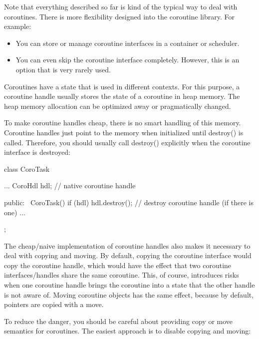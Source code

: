 Note that everything described so far is kind of the typical way to deal with coroutines. There is more flexibility designed into the coroutine library. For example:

\begin{itemize}
\item 
You can store or manage coroutine interfaces in a container or scheduler.

\item 
You can even skip the coroutine interface completely. However, this is an option that is very rarely used.
\end{itemize}


Coroutines have a state that is used in different contexts. For this purpose, a coroutine handle usually stores the state of a coroutine in heap memory. The heap memory allocation can be optimized away or pragmatically changed.


To make coroutine handles cheap, there is no smart handling of this memory. Coroutine handles just point to the memory when initialized until destroy() is called. Therefore, you should usually call destroy() explicitly when the coroutine interface is destroyed:

\begin{cpp}
class CoroTask {
	...
	CoroHdl hdl; // native coroutine handle
	
	public:
	~CoroTask() {
		if (hdl) {
			hdl.destroy(); // destroy coroutine handle (if there is one)
		}
	}
	...
};
\end{cpp}


The cheap/naive implementation of coroutine handles also makes it necessary to deal with copying and moving. By default, copying the coroutine interface would copy the coroutine handle, which would have the effect that two coroutine interfaces/handles share the same coroutine. This, of course, introduces risks when one coroutine handle brings the coroutine into a state that the other handle is not aware of. Moving coroutine objects has the same effect, because by default, pointers are copied with a move.

To reduce the danger, you should be careful about providing copy or move semantics for coroutines. The easiest approach is to disable copying and moving:

